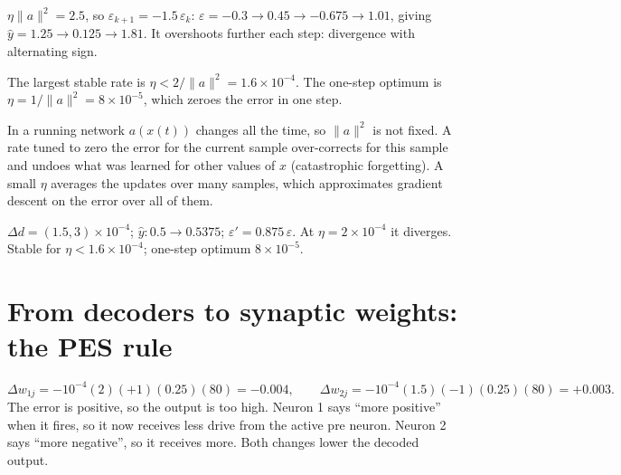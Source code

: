 \documentclass[11pt,letterpaper]{article}
\newcommand{\ans}[1]{\par\vspace{4pt}{\bfseries #1}\quad}
\begin{document}
\ans{Q2}
$\eta\|a\|^2 = 2.5$, so $\varepsilon_{k+1} = -1.5\,\varepsilon_k$: $\varepsilon = -0.3 \to 0.45 \to -0.675 \to 1.01$, giving $\hat y = 1.25 \to 0.125 \to 1.81$. It overshoots further each step: divergence with alternating sign.

The largest stable rate is $\eta < 2/\|a\|^2 = 1.6\times10^{-4}$. The one-step optimum is $\eta = 1/\|a\|^2 = 8\times10^{-5}$, which zeroes the error in one step.

In a running network $a(x(t))$ changes all the time, so $\|a\|^2$ is not fixed. A rate tuned to zero the error for the current sample over-corrects for this sample and undoes what was learned for other values of $x$ (catastrophic forgetting). A small $\eta$ averages the updates over many samples, which approximates gradient descent on the error over all of them.
\begin{center}
\end{center}
\begin{result}
$\Delta d = (1.5, 3)\times10^{-4}$; $\hat y: 0.5 \to 0.5375$; $\varepsilon' = 0.875\,\varepsilon$. At $\eta = 2\times10^{-4}$ it diverges. Stable for $\eta < 1.6\times10^{-4}$; one-step optimum $8\times10^{-5}$.
\end{result}

\section{From decoders to synaptic weights: the PES rule}

\ans{Q1}
\[
\Delta w_{1j} = -10^{-4}(2)(+1)(0.25)(80) = -0.004, \qquad \Delta w_{2j} = -10^{-4}(1.5)(-1)(0.25)(80) = +0.003.
\]
The error is positive, so the output is too high. Neuron 1 says ``more positive'' when it fires, so it now receives less drive from the active pre neuron. Neuron 2 says ``more negative'', so it receives more. Both changes lower the decoded output.
\end{document}

